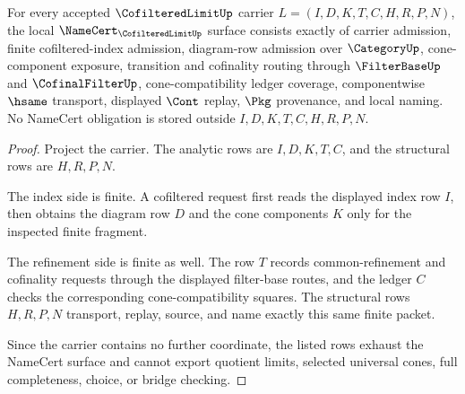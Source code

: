 \begin{theorem}
\label{thm:cofiltered-limit-namecert-obligations}
For every accepted $\CofilteredLimitUp$ carrier $L=(I,D,K,T,C,H,R,P,N)$, the local $\NameCert_{\CofilteredLimitUp}$ surface consists exactly of carrier admission, finite cofiltered-index admission, diagram-row admission over $\CategoryUp$, cone-component exposure, transition and cofinality routing through $\FilterBaseUp$ and $\CofinalFilterUp$, cone-compatibility ledger coverage, componentwise $\hsame$ transport, displayed $\Cont$ replay, $\Pkg$ provenance, and local naming. No NameCert obligation is stored outside $I,D,K,T,C,H,R,P,N$.
\end{theorem}
\begin{proof}
Project the carrier. The analytic rows are $I,D,K,T,C$, and the structural rows are $H,R,P,N$.

The index side is finite. A cofiltered request first reads the displayed index row $I$, then obtains the diagram row $D$ and the cone components $K$ only for the inspected finite fragment.

The refinement side is finite as well. The row $T$ records common-refinement and cofinality requests through the displayed filter-base routes, and the ledger $C$ checks the corresponding cone-compatibility squares. The structural rows $H,R,P,N$ transport, replay, source, and name exactly this same finite packet.

Since the carrier contains no further coordinate, the listed rows exhaust the NameCert surface and cannot export quotient limits, selected universal cones, full completeness, choice, or bridge checking.
\end{proof}

